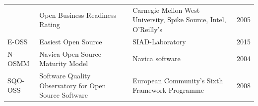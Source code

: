 \documentclass[12pt,magyar,a4paper,oneside]{scrreprt}
\begin{document}
\begin{longtable}[]{@{}llll@{}}
\begin{minipage}[t]{0.14\columnwidth}
\end{minipage} & \begin{minipage}[t]{0.49\columnwidth}\raggedright
Open Business Readiness Rating\strut
\end{minipage} & \begin{minipage}[t]{0.21\columnwidth}\raggedright
Carnegie Mellon West University, Spike Source, Intel, O'Reilly's\strut
\end{minipage} & \begin{minipage}[t]{0.04\columnwidth}\raggedright
2005\strut
\end{minipage}\tabularnewline
\begin{minipage}[t]{0.14\columnwidth}\raggedright
E-OSS\strut
\end{minipage} & \begin{minipage}[t]{0.49\columnwidth}\raggedright
Easiest Open Source\strut
\end{minipage} & \begin{minipage}[t]{0.21\columnwidth}\raggedright
SIAD-Laboratory\strut
\end{minipage} & \begin{minipage}[t]{0.04\columnwidth}\raggedright
2015\strut
\end{minipage}\tabularnewline
\begin{minipage}[t]{0.14\columnwidth}\raggedright
N-OSMM\strut
\end{minipage} & \begin{minipage}[t]{0.49\columnwidth}\raggedright
Navica Open Source Maturity Model\strut
\end{minipage} & \begin{minipage}[t]{0.21\columnwidth}\raggedright
Navica software\strut
\end{minipage} & \begin{minipage}[t]{0.04\columnwidth}\raggedright
2004\strut
\end{minipage}\tabularnewline
\begin{minipage}[t]{0.14\columnwidth}\raggedright
SQO-OSS\strut
\end{minipage} & \begin{minipage}[t]{0.49\columnwidth}\raggedright
Software Quality Observatory for Open Source Software\strut
\end{minipage} & \begin{minipage}[t]{0.21\columnwidth}\raggedright
European Community's Sixth Framework Programme\strut
\end{minipage} & \begin{minipage}[t]{0.04\columnwidth}\raggedright
2008\strut
\end{minipage}\tabularnewline
\bottomrule
\end{longtable}
\end{document}
